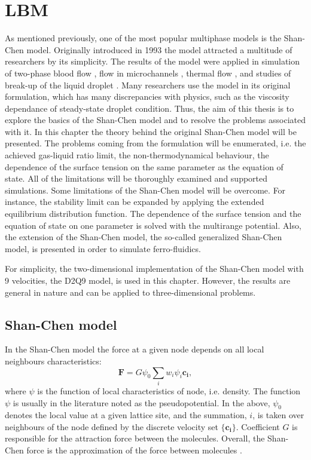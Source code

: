 \documentclass[mathpazo,sort,numbers]{cicp}
\begin{document}
\section{LBM}
\label{sec:lbm:binary:liquids}
As mentioned previously, one of the most popular multiphase models is the Shan-Chen model. Originally introduced in 1993 \cite{Shan-chen:extended} the model attracted a multitude of researchers by its simplicity. The results of the model were applied in simulation of two-phase blood flow \cite{halliday-multicomponent}, flow in microchannels \cite{fan-multi}, thermal flow \cite{zhang-thermal}, and studies of break-up of the liquid droplet \cite{nourgaliev-breakup}. Many researchers use the model in its original formulation, which has many discrepancies with physics, such as the viscosity dependance of steady-state droplet condition. Thus, the aim of this thesis is to explore the basics of the Shan-Chen model and to resolve the problems associated with it. In this chapter the theory behind the original Shan-Chen model will be presented. The problems coming from the formulation will be enumerated, i.e. the achieved gas-liquid ratio limit, the non-thermodynamical behaviour, the dependence of the surface tension on the same parameter as the equation of state. All of the limitations will be thoroughly examined and supported simulations. Some limitations of the Shan-Chen model will be overcome. For instance, the stability limit can be expanded by applying the extended equilibrium distribution function. The dependence of the surface tension and the equation of state on one parameter is solved with the multirange potential. Also, the extension of the Shan-Chen model, the so-called generalized Shan-Chen model, is presented in order to simulate ferro-fluidics. 

For simplicity, the two-dimensional implementation of the Shan-Chen model with 9 velocities, the D2Q9 model, is used in this chapter. However, the results are general in nature and can be applied to three-dimensional problems.

\subsection{Shan-Chen model}

In the Shan-Chen model \cite{Shan-chen:extended} the force at a given node depends on all local neighbours characteristics:
\begin{equation}  \label{Shan-Chen:Shan-Chen:cont}
\bm{F}=G\psi_{0}\sum_{i}{w_i \psi_{i}\bm{c_{i}}},
\end{equation}
where $\psi$ is the function of local characteristics of node, i.e. density. The function $\psi$ is usually in the literature noted as the pseudopotential. In the above, $\psi_0$ denotes the local value at a given lattice site, and the summation, $i$, is taken over
neighbours of the node defined by the discrete velocity set $\{\bm{c_i}\}$. Coefficient $G$ is responsible for the attraction force between the molecules. Overall, the Shan-Chen force is the approximation of the force between molecules \cite{kwok,kwok-contact-angle}.
\end{document}
